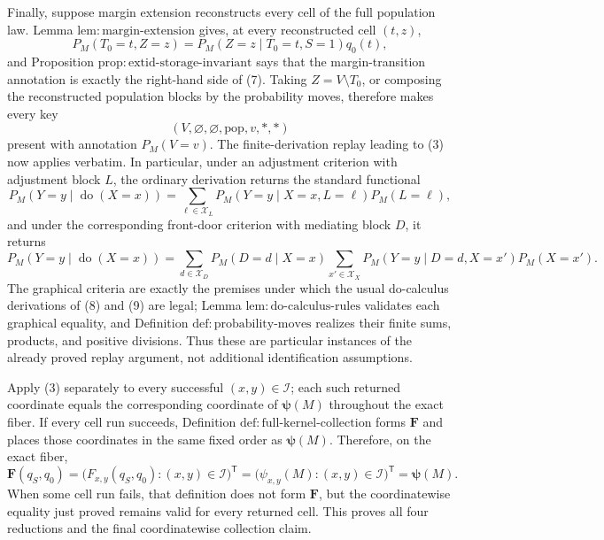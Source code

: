 Finally, suppose margin extension reconstructs every cell of the full population law.  Lemma \(\mathrm{lem{:}margin\text{-}extension}\) gives, at every reconstructed cell \((t,z)\),
\[
P_M(T_0=t,Z=z)
=P_M(Z=z\mid T_0=t,S=1)q_0(t), \tag{7}
\]
and Proposition \(\mathrm{prop{:}extid\text{-}storage\text{-}invariant}\) says that the margin-transition annotation is exactly the right-hand side of (7).  Taking \(Z=V\setminus T_0\), or composing the reconstructed population blocks by the probability moves, therefore makes every key
\[
(V,\varnothing,\varnothing,\mathrm{pop},v,\ast,\ast)
\]
present with annotation \(P_M(V=v)\).  The finite-derivation replay leading to (3) now applies verbatim.  In particular, under an adjustment criterion with adjustment block \(L\), the ordinary derivation returns the standard functional
\[
P_M(Y=y\mid\operatorname{do}(X=x))
=\sum_{\ell\in\mathcal X_L}P_M(Y=y\mid X=x,L=\ell)P_M(L=\ell), \tag{8}
\]
and under the corresponding front-door criterion with mediating block \(D\), it returns
\[
P_M(Y=y\mid\operatorname{do}(X=x))
=\sum_{d\in\mathcal X_D}P_M(D=d\mid X=x)
  \sum_{x'\in\mathcal X_X}P_M(Y=y\mid D=d,X=x')P_M(X=x'). \tag{9}
\]
The graphical criteria are exactly the premises under which the usual do-calculus derivations of (8) and (9) are legal; Lemma \(\mathrm{lem{:}do\text{-}calculus\text{-}rules}\) validates each graphical equality, and Definition \(\mathrm{def{:}probability\text{-}moves}\) realizes their finite sums, products, and positive divisions.  Thus these are particular instances of the already proved replay argument, not additional identification assumptions.

Apply (3) separately to every successful \((x,y)\in\mathcal I\); each such returned coordinate equals the corresponding coordinate of \(\boldsymbol\psi(M)\) throughout the exact fiber.  If every cell run succeeds, Definition \(\mathrm{def{:}full\text{-}kernel\text{-}collection}\) forms \(\mathbf F\) and places those coordinates in the same fixed order as \(\boldsymbol\psi(M)\).  Therefore, on the exact fiber,
\[
\mathbf F(q_S,q_0)
=\bigl(F_{x,y}(q_S,q_0):(x,y)\in\mathcal I\bigr)^{\mathsf T}
=\bigl(\psi_{x,y}(M):(x,y)\in\mathcal I\bigr)^{\mathsf T}
=\boldsymbol\psi(M).
\]
When some cell run fails, that definition does not form \(\mathbf F\), but the coordinatewise equality just proved remains valid for every returned cell.  This proves all four reductions and the final coordinatewise collection claim.